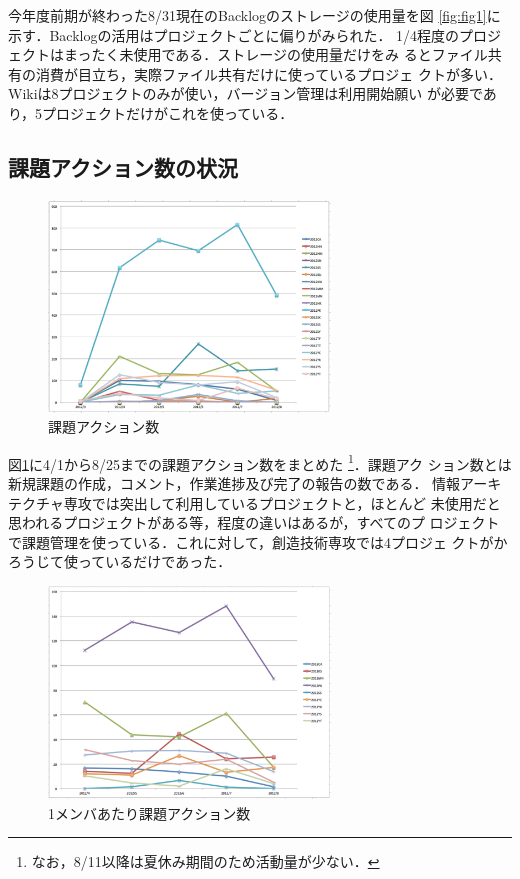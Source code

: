 \documentclass[submit,techreq,noauthor]{ipsj}
\begin{document}
今年度前期が終わった8/31現在のBacklogのストレージの使用量を図
\ref{fig:fig1}に示す．Backlogの活用はプロジェクトごとに偏りがみられた．
1/4程度のプロジェクトはまったく未使用である．ストレージの使用量だけをみ
るとファイル共有の消費が目立ち，実際ファイル共有だけに使っているプロジェ
クトが多い．Wikiは8プロジェクトのみが使い，バージョン管理は利用開始願い
が必要であり，5プロジェクトだけがこれを使っている．

\subsection{課題アクション数の状況}

\begin{figure}[tb]
\begin{center}
\includegraphics[width=7.5cm]{./figure/fig2.eps}
\end{center}
\caption{課題アクション数}
\label{fig:fig2}
\end{figure}

図\ref{fig:fig2}に4/1から8/25までの課題アクション数をまとめた
\footnote{なお，8/11以降は夏休み期間のため活動量が少ない．}．課題アク
ション数とは新規課題の作成，コメント，作業進捗及び完了の報告の数である．
情報アーキテクチャ専攻では突出して利用しているプロジェクトと，ほとんど
未使用だと思われるプロジェクトがある等，程度の違いはあるが，すべてのプ
ロジェクトで課題管理を使っている．これに対して，創造技術専攻では4プロジェ
クトがかろうじて使っているだけであった．

\begin{figure}[tb]
\begin{center}
\includegraphics[width=7.5cm]{./figure/fig3.eps}
\end{center}
\caption{1メンバあたり課題アクション数}
\label{fig:fig3}
\end{figure}
\end{document}
